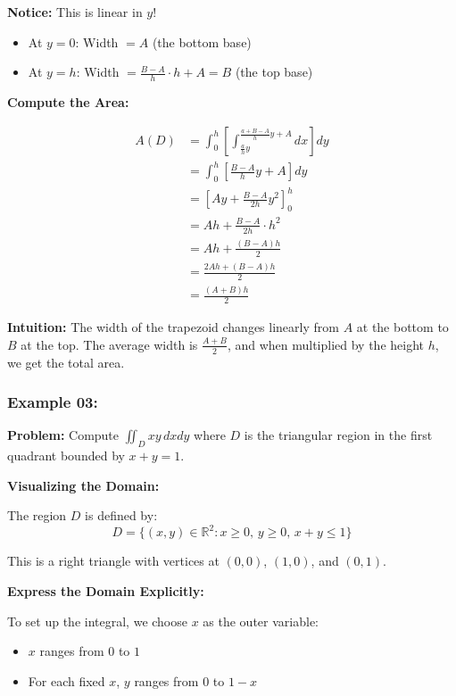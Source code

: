 \textbf{Notice:} This is linear in $y$!
\begin{itemize}
  \item At $y = 0$: Width $= A$ (the bottom base)
  \item At $y = h$: Width $= \frac{B-A}{h} \cdot h + A = B$ (the top base)
\end{itemize}
 
\textbf{Compute the Area:}
 
\begin{align*}
A(D) &= \int_0^h \left[\int_{\frac{a}{h}y}^{\frac{a+B-A}{h}y + A} dx\right] dy \\[0.5em]
&= \int_0^h \left[\frac{B-A}{h}y + A\right] dy \\[0.5em]
&= \left[Ay + \frac{B-A}{2h}y^2\right]_0^h \\[0.5em]
&= Ah + \frac{B-A}{2h} \cdot h^2 \\[0.5em]
&= Ah + \frac{(B-A)h}{2} \\[0.5em]
&= \frac{2Ah + (B-A)h}{2} \\[0.5em]
&= \frac{(A+B)h}{2}
\end{align*}
 
 
\textbf{Intuition:} The width of the trapezoid changes linearly from $A$ at the bottom to $B$ at the top. The average width is $\frac{A+B}{2}$, and when multiplied by the height $h$, we get the total area.
 



\subsubsection{Example 03:}

\textbf{Problem:} Compute $\displaystyle \iint_D xy \, dxdy$ where $D$ is the triangular region in the first quadrant bounded by $x + y = 1$.
 
\textbf{Visualizing the Domain:}
 
The region $D$ is defined by:
\[
D = \{(x,y) \in \mathbb{R}^2 : x \geq 0, \, y \geq 0, \, x + y \leq 1\}
\]
 
This is a right triangle with vertices at $(0,0)$, $(1,0)$, and $(0,1)$.
 
\textbf{Express the Domain Explicitly:}
 
To set up the integral, we choose $x$ as the outer variable:
\begin{itemize}
  \item $x$ ranges from $0$ to $1$
  \item For each fixed $x$, $y$ ranges from $0$ to $1-x$
\end{itemize}
 
